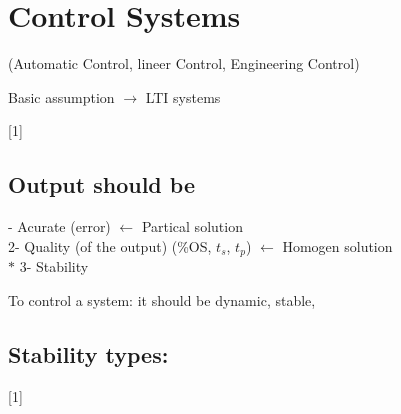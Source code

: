 \documentclass[11pt,a4paper]{article}
\begin{document}

\section{Control Systems}
(Automatic Control, lineer Control, Engineering Control)

Basic assumption $\rightarrow$ LTI systems

[1]

\subsection{Output should be}
- Acurate (error) \hfill \textcolor{turuncukalem}{$\leftarrow$ Partical solution}\\
2- Quality (of the output) (\%OS, $t_s$, $t_p$) \hfill \textcolor{turuncukalem}{$\leftarrow$ Homogen solution}\\
\textcolor{kirmizikalem}{$\ast$} 3- Stability

\bigskip
\noindent\textcolor{kirmizikalem}{To control a system:} it should be dynamic, stable,

\subsection{Stability types:}
[1]
\end{document}
